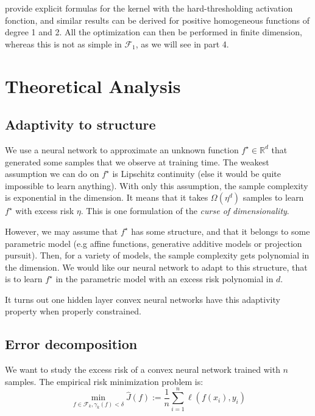 \documentclass[a4paper, 11pt]{scrartcl}
\begin{document}
{\cite{le2007continuous} provide explicit formulas for the kernel with the hard-thresholding activation fonction, and similar results can be derived for positive homogeneous functions of degree 1 and 2. All the optimization can then be performed in finite dimension, whereas this is not as simple in $\mathcal{F}_1$, as we will see in part 4.

\section{Theoretical Analysis}

\subsection{Adaptivity to structure}

We use a neural network to approximate an unknown function $f^\star \in \mathbb{R}^d$ that generated some samples that we observe at training time. The weakest assumption we can do on $f^\star$ is Lipschitz continuity (else it would be quite impossible to learn anything). With only this assumption, the sample complexity is exponential in the dimension. It means that it takes $\Omega(\eta^{d})$ samples to learn $f^\star$ with excess risk $\eta$. This is one formulation of the \textit{curse of dimensionality}.

However, we may assume that $f^\star$ has some structure, and that it belongs to some parametric model (e.g affine functions, generative additive models or projection pursuit). Then, for a variety of models, the sample complexity gets polynomial in the dimension. We would like our neural network to adapt to this structure, that is to learn $f^\star$ in the parametric model with an excess risk polynomial in $d$.

It turns out one hidden layer convex neural networks have this adaptivity property when properly constrained. 

\subsection{Error decomposition}

We want to study the excess risk of a convex neural network trained with $n$ samples. The empirical risk minimization problem is:
\begin{equation}
\min_{f \in \mathcal{F}_k, \gamma_k(f)<\delta} \hat J(f) := \frac{1}{n} \sum_{i=1}^n \ell(f(x_i), y_i)
\end{equation}

}
\end{document}
